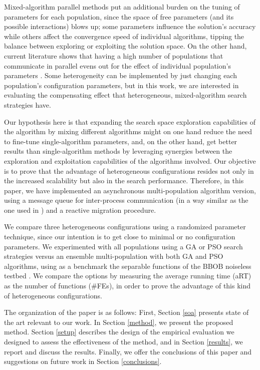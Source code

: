 \documentclass[runningheads]{llncs}
\begin{document}
Mixed-algorithm parallel methods put an
additional burden on the tuning of parameters for each population,
since the space of free parameters (and its possible interactions)
blows up; some
parameters influence the solution's accuracy while others affect the convergence
speed of individual algorithms, tipping the balance between exploring or
exploiting the solution space. On the other hand, current literature shows that
having a high number of populations that communicate in parallel
evens out
for the effect of individual population's parameters
\cite{li2016multi,tanabe2013evaluation}. Some heterogeneity can be implemented
by just changing each population's configuration parameters, but in this work,
we are interested in evaluating the compensating effect that
heterogeneous, mixed-algorithm search strategies have. %

Our hypothesis here is that expanding the search space exploration
capabilities of the algorithm by mixing different algorithms might on
one hand reduce the need to fine-tune single-algorithm parameters,
and, on the other hand, get better results than single-algorithm
methods by leveraging synergies between the exploration and
exploitation capabilities of the algorithms involved. Our objective is to prove that
the advantage of heterogeneous configurations resides not only in the increased
scalability but also in the search performance.
Therefore, in this paper, we  have implemented an asynchronous
multi-population algorithm version, using a message queue for inter-process
communication (in a way similar as the one used in
\cite{guervos2018introducing}) and a reactive migration procedure.

We compare three heterogeneous configurations using a randomized
parameter technique, since our intention is to get close to minimal or
no configuration parameters.  We experimented with all populations
using a GA or PSO search strategies versus an ensemble
multi-population with both GA and PSO algorithms, using as a benchmark
the separable functions of the BBOB noiseless testbed
\cite{hansen2009real}. We compare the options by measuring the average
running time (aRT) as the number of functions (\#FEs), in order to
prove the advantage of this kind of heterogeneous configurations.

The organization of the paper is as follows: First, Section \ref{soa} presents
state of the art relevant to our work. In Section \ref{method}, we present the
proposed method.  Section \ref{setup} describes the design of the empirical
evaluation we designed to assess the effectiveness of the method, and in Section
\ref{results}, we report and discuss the results. Finally, we offer the
conclusions of this paper and suggestions on future work in Section
\ref{conclusions}.
\end{document}
